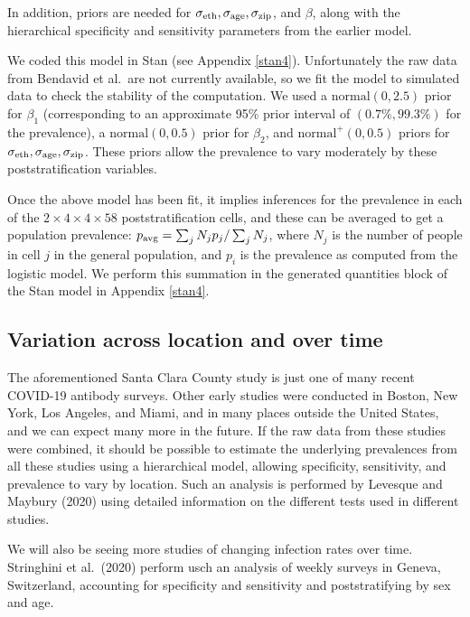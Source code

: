\documentclass[11pt]{article}
\begin{document}
In addition, priors are needed for $\sigma_{\rm eth}, \sigma_{\rm age},\sigma_{\rm zip}$, and $\beta$, along with the hierarchical specificity and sensitivity parameters from the earlier model.

We coded this model in Stan (see Appendix \ref{stan4}).  Unfortunately the raw data from Bendavid et al.\  are not currently available, so we fit the model to simulated data to check the stability of the computation.  We used a $\mbox{normal}(0,2.5)$ prior for $\beta_1$ (corresponding to an approximate 95\% prior interval of $(0.7\%, 99.3\%)$ for the prevalence), a $\mbox{normal}(0,0.5)$ prior for $\beta_2$, and $\mbox{normal}^+(0, 0.5)$ priors for $\sigma_{\rm eth}, \sigma_{\rm age},\sigma_{\rm zip}$.  These priors allow the prevalence to vary moderately by these poststratification variables.

Once the above model has been fit, it implies inferences for the prevalence in each of the $2\times 4 \times 4 \times 58$ poststratification cells, and these can be averaged to get a population prevalence:  $p_{\rm avg} = \sum_jN_jp_j/\sum_jN_j$, where $N_j$ is the number of people in cell $j$ in the general population, and $p_i$ is the prevalence as computed from the logistic model.  We perform this summation in the generated quantities block of the Stan model in Appendix \ref{stan4}.

\subsection{Variation across location and over time}\label{muiltiple}
The aforementioned Santa Clara County study is just one of many recent COVID-19 antibody surveys.  Other early studies were conducted in Boston, New York, Los Angeles, and Miami, and in many places outside the United States, and we can expect many more in the future.  If the raw data from these studies were combined, it should be possible to estimate the underlying prevalences from all these studies using a hierarchical model, allowing specificity, sensitivity, and prevalence to vary by location.  Such an analysis is performed by Levesque and Maybury (2020) using detailed information on the different tests used in different studies.

We will also be seeing more studies of changing infection rates over time.  Stringhini et al.\ (2020) perform usch an analysis of weekly surveys in Geneva, Switzerland, accounting for specificity and sensitivity and poststratifying by sex and age.
\end{document}

